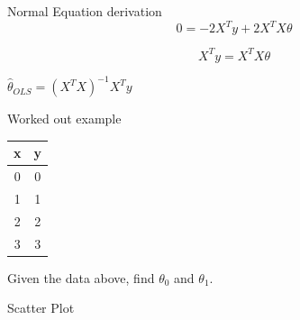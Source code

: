 \documentclass{beamer}
\begin{document}
\begin{frame}{Normal Equation derivation}
$$
    0 = -2X^{T}y + 2X^{T}X\theta
$$

$$
    X^{T}y  = X^{T}X\theta
$$

\begin{tcolorbox}
\begin{center}
    

        $\hat{\theta}_{OLS} = (X^{T}X)^{-1}X^{T}y$
\end{center}
\end{tcolorbox}

\end{frame}

\begin{frame}{Worked out example}
    \begin{center}
 \begin{tabular}{||c c||} 
 \hline
 x  & y \\ [0.5ex] 
 \hline\hline
 0 & 0 \\
 1 & 1 \\
 2 & 2 \\
 3 & 3 \\
 \hline
\end{tabular}
\end{center}

Given the data above, find $\theta_{0}$ and $\theta_{1}$.

\end{frame}


\begin{frame}{Scatter Plot}
    
\end{frame}
\end{document}
